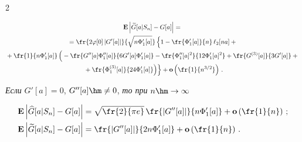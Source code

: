 \begin{multicols}{2}
\noindent


  \begin{multline}


\mathbf{E} \left|\widetilde{G}[a|S_n]-G[a]\right|={}\\


{}=


  \fr{2\varphi[0]\left|G'[a]\right|}{\sqrt{n\Phi_1 '[a]}}


 \left\{


 \vphantom{\fr{\Phi_1^{(3)}[a]}{24 \Phi_1'[a]}}


 1 -\fr{\Phi_1 '[a]}{n}\,\ell_2[na]+{}\right.\\ 


 {} +\fr{1}{n\Phi_1'[a]}\left(


 \vphantom{\fr{\Phi_1^{(3)}[a]}{24 \Phi_1'[a]}}


  -\fr{G''[a] \Phi_1''[a]}{6 G'[a] \Phi_1'[a]}


  -\fr{\Phi_1''[a]^2}{12\Phi_1'[a]^2}


  +\fr{ G^{(3)}[a]}{3 G'[a] }


  +{}\right.\\


\left.\left.  {}+\fr{\Phi_1^{(3)}[a]}{24 \Phi_1'[a]}\right)\right\}


  +\mathbf{o}\left(\fr{1}{n^{3/2}}\right)\,.


  \label{e4-ch}


 \end{multline}


  \textit{Если}  $G'[a]= 0$, $G''[a]\hm\neq 0$, \textit{то при} $n \hm\to \infty$


  


  \noindent


  \begin{align}


 \mathbf{E} &\left|\widehat{G}[a|S_n]-G[a]\right|=


   \sqrt{\fr{2}{\pi e}}\,\fr{\left|G''[a]\right|}{ n \Phi_1'[a]}+\mathbf{o}\left(


   \fr{1}{n}\right)\,;


 \label{e5-ch}\\


 \mathbf{E} &\left|\widetilde{G}[a|S_n]-G[a]\right|=


   \fr{\left|G''[a]\right|}{2n \Phi_1'[a]}+\mathbf{o}\left(\fr{1}{n}\right)\,.


 \label{e6-ch}


  \end{align}






\end{multicols}
